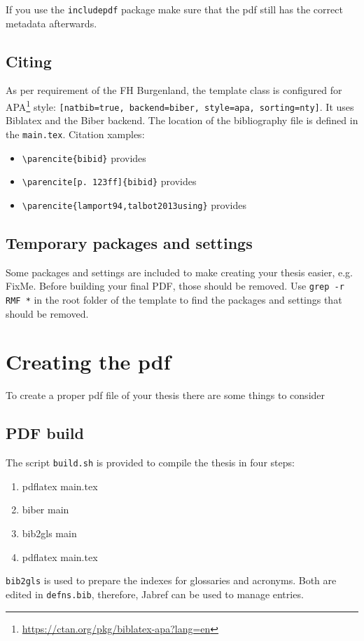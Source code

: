 If you use the \verb|includepdf| package make sure that the pdf still has the correct metadata afterwards.

\subsection{Citing}
As per requirement of the FH Burgenland, the template class is configured for APA\footnote{\url{https://ctan.org/pkg/biblatex-apa?lang=en}} style: \verb|[natbib=true, backend=biber, style=apa, sorting=nty]|. It uses Biblatex and the Biber backend. The location of the bibliography file is defined in the \verb|main.tex|. Citation xamples:
\begin{itemize}
	\item \verb|\parencite{bibid}| provides \parencite{lamport94}
	\item \verb|\parencite[p. 123ff]{bibid}| provides \parencite[p. 123ff]{lamport94}
	\item \verb|\parencite{lamport94,talbot2013using}| provides \parencite{lamport94,talbot2013using}
\end{itemize}

\subsection{Temporary packages and settings}
Some packages and settings are included to make creating your thesis easier, e.g. FixMe.
Before building your final PDF, those should be removed. Use \verb|grep -r RMF *| in the root folder of the template to find the packages and settings that should be removed.

\section{Creating the pdf}
To create a proper pdf file of your thesis there are some things to consider

\subsection{PDF build}
The script \verb|build.sh| is provided to compile the thesis in four steps:
\begin{enumerate}
	\item pdflatex main.tex
	\item biber main
	\item bib2gls main
	\item pdflatex main.tex
\end{enumerate}
\verb+bib2gls+ is used to prepare the indexes for glossaries and acronyms. Both are edited in \verb|defns.bib|, therefore, Jabref can be used to manage entries. 

